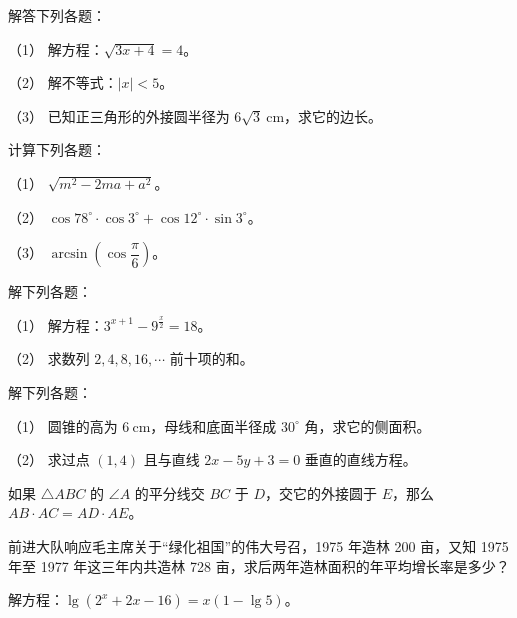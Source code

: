 \begin{question}
解答下列各题：

（1） 解方程：$\sqrt{3x+4}=4$。

（2） 解不等式：$|x|<5$。

（3） 已知正三角形的外接圆半径为 $6\sqrt3\ \mathrm{cm}$，求它的边长。

\end{question}
\begin{question}
计算下列各题：

（1） $\sqrt{m^2-2ma+a^2}$。

（2） $\cos78^\circ\cdot\cos3^\circ+\cos12^\circ\cdot\sin3^\circ$。

（3） $\arcsin\left(\cos\dfrac{\pi}{6}\right)$。

\end{question}
\begin{question}
解下列各题：

（1） 解方程：$3^{x+1}-9^{\frac{x}{2}}=18$。

（2） 求数列 $2,4,8,16,\cdots$ 前十项的和。

\end{question}
\begin{question}
解下列各题：

（1） 圆锥的高为 $6\ \mathrm{cm}$，母线和底面半径成 $30^\circ$ 角，求它的侧面积。

（2） 求过点 $(1,4)$ 且与直线 $2x-5y+3=0$ 垂直的直线方程。

\Needspace{0.4\textheight}
\end{question}
\begin{question}
如果 $\triangle ABC$ 的 $\angle A$ 的平分线交 $BC$ 于 $D$，交它的外接圆于 $E$，那么 $AB\cdot AC=AD\cdot AE$。
\nopagebreak[4]
\begin{center}\end{center}
\nopagebreak[4]
\end{question}
\begin{question}
前进大队响应毛主席关于“绿化祖国”的伟大号召，1975 年造林 200 亩，又知 1975 年至 1977 年这三年内共造林 728 亩，求后两年造林面积的年平均增长率是多少？

\end{question}
\begin{question}
解方程：$\lg(2^x+2x-16)=x(1-\lg5)$。

\Needspace{0.4\textheight}
\end{question}
